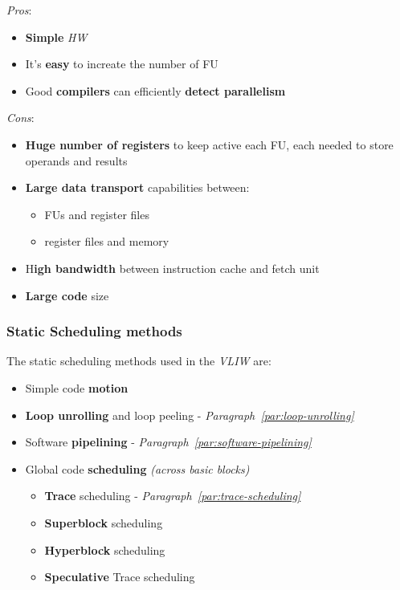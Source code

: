 \documentclass[english]{article}
\begin{document}
\textit{Pros}:
\begin{itemize}[label=\cmark]
  \item \textbf{Simple} \textit{HW}
  \item It's \textbf{easy} to increate the number of FU
  \item Good \textbf{compilers} can efficiently \textbf{detect parallelism}
\end{itemize}

\bigskip
\textit{Cons}:
\begin{itemize}[label=\xmark]
  \item \textbf{Huge number of registers }to keep active each FU, each needed to store operands and results
  \item \textbf{Large data transport} capabilities between:
        \begin{itemize}
          \item FUs and register files
          \item register files and memory
        \end{itemize}
  \item H\textbf{igh bandwidth} between instruction cache and fetch unit
  \item \textbf{Large code} size
\end{itemize}

\subsubsection{Static Scheduling methods}

The static scheduling methods used in the \textit{VLIW} are:

\begin{itemize}
  \item Simple code \textbf{motion}
  \item \textbf{Loop unrolling} and loop peeling - \textit{Paragraph~\ref{par:loop-unrolling}}
  \item Software \textbf{pipelining} - \textit{Paragraph~\ref{par:software-pipelining}}
  \item Global code \textbf{scheduling} \textit{(across basic blocks)}
        \begin{itemize}
          \item \textbf{Trace} scheduling - \textit{Paragraph~\ref{par:trace-scheduling}}
          \item \textbf{Superblock} scheduling
          \item \textbf{Hyperblock} scheduling
          \item \textbf{Speculative} Trace scheduling
        \end{itemize}
\end{itemize}
\end{document}
